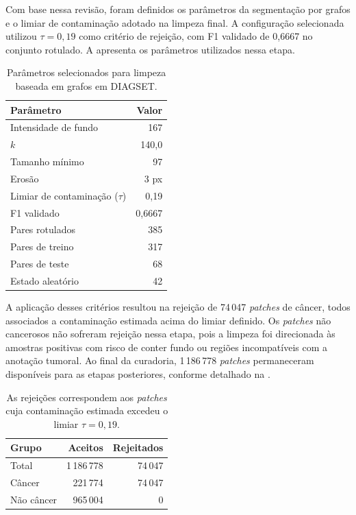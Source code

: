 Com base nessa revisão, foram definidos os parâmetros da segmentação por grafos e o limiar de contaminação adotado na limpeza final. A configuração selecionada utilizou $\tau=0{,}19$ como critério de rejeição, com F1 validado de 0{,}6667 no conjunto rotulado. A  apresenta os parâmetros utilizados nessa etapa.

\begin{table}[!htb]
\centering
\caption{Parâmetros selecionados para limpeza baseada em grafos em DIAGSET.}
\label{tab:results_diagset-stage3-graph}
\small
\begin{tabular}{lr}
\toprule
Parâmetro & Valor \\
\midrule
Intensidade de fundo & 167 \\
$k$ & 140{,}0 \\
Tamanho mínimo & 97 \\
Erosão & 3 px \\
Limiar de contaminação ($\tau$) & 0{,}19 \\
F1 validado & 0{,}6667 \\
Pares rotulados & 385 \\
Pares de treino & 317 \\
Pares de teste & 68 \\
Estado aleatório & 42 \\
\bottomrule
\end{tabular}
\end{table}

A aplicação desses critérios resultou na rejeição de 74\,047 \textit{patches} de câncer, todos associados a contaminação estimada acima do limiar definido. Os \textit{patches} não cancerosos não sofreram rejeição nessa etapa, pois a limpeza foi direcionada às amostras positivas com risco de conter fundo ou regiões incompatíveis com a anotação tumoral. Ao final da curadoria, 1\,186\,778 \textit{patches} permaneceram disponíveis para as etapas posteriores, conforme detalhado na .

\begin{table}[!htb]
\centering
\caption{Decisões de curadoria aplicadas aos \textit{patches} de DIAGSET.}
\label{tab:results_diagset-stage3-cleaning}
\small
\begin{tabular}{lrr}
\toprule
Grupo & Aceitos & Rejeitados \\
\midrule
Total & 1\,186\,778 & 74\,047 \\
Câncer & 221\,774 & 74\,047 \\
Não câncer & 965\,004 & 0 \\
\bottomrule
\end{tabular}
\caption*{\footnotesize As rejeições correspondem aos \textit{patches} cuja contaminação estimada excedeu o limiar $\tau=0{,}19$.}
\end{table}

